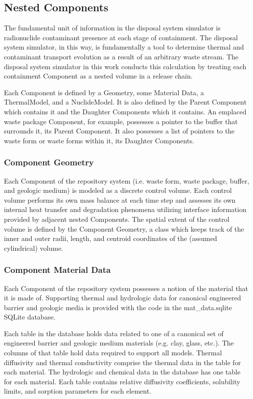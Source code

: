 \subsection{Nested Components}

The fundamental unit of information in the disposal system simulator is radionuclide 
contaminant presence at each stage of containment.  The disposal system simulator, in 
this way, is fundamentally a tool to determine thermal and contaminant 
transport evolution as a result of an arbitrary waste stream. The disposal 
system simulator in this work conducts this calculation by  treating each containment 
Component as a nested volume in a release chain. 

Each Component is defined by a Geometry, some Material Data, a ThermalModel, 
and a NuclideModel. It is also defined by the Parent Component which contains 
it and the Daughter Components which it contains. An emplaced waste package 
Component, for example, possesses a pointer to the buffer that surrounds it, 
its Parent Component. It also possesses a list of pointers to the waste form or 
waste forms within it, its Daughter Components. 

\subsubsection{Component Geometry}

Each Component of the repository system (i.e. waste form, waste package, 
buffer, and geologic medium) is modeled as a discrete control volume. Each 
control volume performs its own mass balance at each time step and assesses its 
own internal  heat transfer and degradation phenomena utilizing interface 
information provided by adjacent nested Components. The spatial extent of the 
control volume is defined by the Component Geometry, a class which keeps track 
of the inner and outer radii, length, and centroid coordinates of the (assumed 
cylindrical) volume.

\subsubsection{Component Material Data}

Each Component of the repository system possesses a notion of the material that 
it is made of. Supporting thermal and hydrologic data for canonical engineered 
barrier and geologic media is provided with the code in the 
mat\_data.sqlite SQLite database.

Each table in the database holds data related to one of a canonical set of 
engineered barrier and geologic medium materials (e.g. clay, glass, etc.).  
The columns of that table hold data required to support all \Cyder models. 
Thermal diffusivity and thermal conductivity comprise the thermal data in the 
table for each material. The hydrologic and chemical data in the database has 
one table for each material. Each table contains relative diffusivity 
coefficients, solubility limits, and sorption parameters for each element.  

